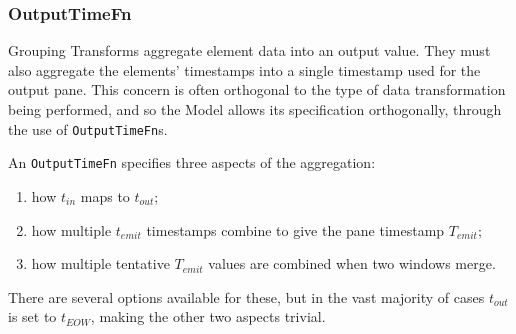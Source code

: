 \subsubsection{OutputTimeFn}
Grouping Transforms aggregate element data into an output value.
They must also aggregate the elements' timestamps into a single timestamp used for the output pane.
This concern is often orthogonal to the type of data transformation being performed, and so the Model allows its specification orthogonally, through the use of \verb|OutputTimeFn|s.

An \verb|OutputTimeFn| specifies three aspects of the aggregation:
\begin{enumerate}
	\item how $t_{\mathit{in}}$ maps to $t_{\mathit{out}}$;
	\item how multiple $t_{\mathit{emit}}$ timestamps combine to give the pane timestamp $T_{\mathit{emit}}$;
	\item how multiple tentative $T_{\mathit{emit}}$ values are combined when two windows merge.
\end{enumerate}

There are several options available for these, but in the vast majority of cases $t_{\mathit{out}}$ is set to $t_{\mathit{EOW}}$, making the other two aspects trivial.
